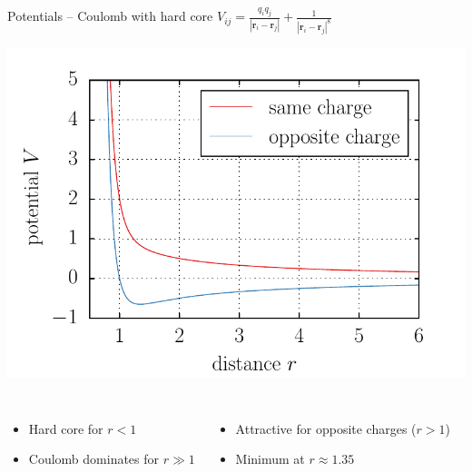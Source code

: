 \documentclass[mathserif,serif]{beamer}
\begin{document}
\begin{frame}{Potentials -- Coulomb with hard core}
	\centering
	$V_{ij} = \frac{q_i q_j}{| \mathbf{r}_i - \mathbf{r}_j |} + \frac{1}{| \mathbf{r}_i - \mathbf{r}_j |^8}$
	
	
	\includegraphics[height=0.5\textheight]{./figures/potential_coulomb.pdf}
	\begin{columns}
			\begin{itemize}
				\item Hard core for $r < 1$
				\item Coulomb dominates for $r \gg 1$
			\end{itemize}
			\begin{itemize}
				\item Attractive for opposite charges ($r > 1$)
				\item Minimum at $r\approx 1.35$
			\end{itemize}
	\end{columns}
	
\end{frame}
\end{document}
